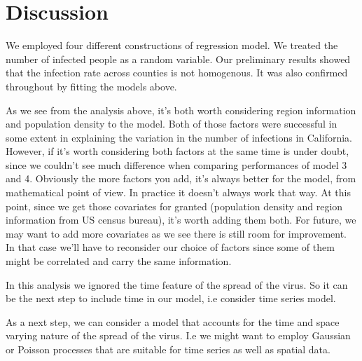 \documentclass[11pt,twocolumn]{asaproc}
\begin{document}
\section{Discussion} %

We employed four different constructions of regression model. We treated the number of infected people as a random variable. Our preliminary results showed that the infection rate across counties is not homogenous. It was also confirmed throughout by fitting the models above. 

As we see from the analysis above, it's both worth considering region information and population density to the model. Both of those factors were successful in some extent in explaining the variation in the number of infections in California. However, if it's worth considering both factors at the same time is under doubt, since we couldn't see much difference when comparing performances of model 3 and 4. Obviously the more factors you add, it's always better for the model, from mathematical point of view. In practice it doesn't always work that way. At this point, since we get those covariates for granted (population density and region information from US census bureau), it's worth adding them both. For future, we may want to add more covariates as we see there is still room for improvement. In that case we'll have to reconsider our choice of factors since some of them might be correlated and carry the same information. 





In this analysis we ignored the time feature of the spread of the virus. So it can be the next step to include time in our model, i.e consider time series model. 

As a next step, we can consider a model that accounts for the time and space varying nature of the spread of the virus. I.e we might want to employ Gaussian or Poisson processes that are suitable for time series as well as spatial data. 




\end{document}
